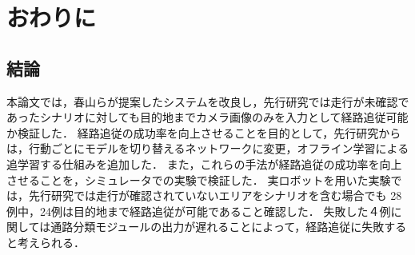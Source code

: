 \chapter{おわりに}
\label{chap:end}
\section{結論}
本論文では，春山らが提案したシステムを改良し，先行研究では走行が未確認であったシナリオに対しても目的地までカメラ画像のみを入力として経路追従可能か検証した．
経路追従の成功率を向上させることを目的として，先行研究からは，行動ごとにモデルを切り替えるネットワークに変更，オフライン学習による追学習する仕組みを追加した．
また，これらの手法が経路追従の成功率を向上させることを，シミュレータでの実験で検証した．
実ロボットを用いた実験では，先行研究では走行が確認されていないエリアをシナリオを含む場合でも 28 例中，24例は目的地まで経路追従が可能であること確認した．
失敗した４例に関しては通路分類モジュールの出力が遅れることによって，経路追従に失敗すると考えられる．
